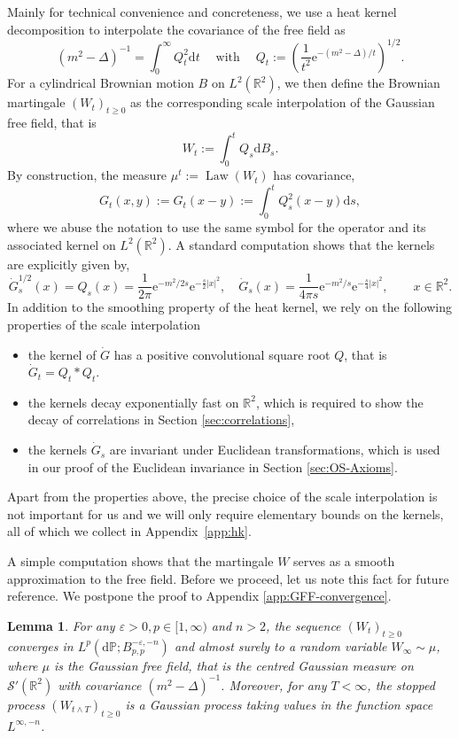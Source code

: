\documentclass[11pt, a4paper]{scrartcl}
\numberwithin{equation}{section}
\theoremstyle{plain}
\newtheorem{lemma}[foo]{Lemma}
\theoremstyle{remark}
\newcommand{\assign}{:=}
\newcommand{\mathd}{\mathrm{d}}
\newcommand{\mathe}{\mathrm{e}}
\newcommand{\tmop}[1]{\ensuremath{\operatorname{#1}}}
\begin{document}
Mainly for technical convenience and concreteness, we use a heat kernel
decomposition to interpolate the covariance of the free field as
\[ (m^2 - \Delta)^{- 1} = \int_0^{\infty} Q_t^2 \mathd t \quad \tmop{with}
	\quad Q_t \assign \left( \frac{1}{t^2} \mathe^{- (m^2 - \Delta) / t}
	\right)^{1 / 2} . \]
For a cylindrical Brownian motion $B$ on $L^2 (\mathbb{R}^2)$, we then define
the Brownian martingale $(W_t)_{t \geqslant 0}$ as the corresponding scale
interpolation of the Gaussian free field, that is
\[ W_t \assign \int_0^t Q_s \mathd B_s . \]
By construction, the measure $\mu^t \assign \tmop{Law} (W_t)$ has covariance,
\begin{equation}
	G_t (x, y) \assign G_t (x - y) \assign \int_0^t Q^2_s (x - y) \mathd s,
	\label{eq:def-G}
\end{equation}
where we abuse the notation to use the same symbol for the operator and its
associated kernel on $L^2 (\mathbb{R}^2)$. A standard computation shows that
the kernels are explicitly given by,
\begin{equation}
	\dot{G}_s^{1 / 2} (x) = Q_s (x) = \frac{1}{2 \pi} \mathe^{- m^2 / 2 s}
	\mathe^{- \frac{s}{2} | x |^2}, \quad \dot{G}_s (x) = \frac{1}{4 \pi s} \mathe^{-
		m^2 / s} \mathe^{- \frac{s}{4} | x |^2} \label{eq:G-kernel}, \qquad x \in
	\mathbb{R}^2 .
\end{equation}
In addition to the smoothing property of the heat kernel, we rely on the following properties of the scale interpolation
\begin{itemize}
	\item the kernel of $\dot{G}$ has a positive convolutional
	      square root $Q$, that is $\dot{G}_t = Q_t \ast Q_t$.
	\item the kernels decay exponentially fast on $\mathbb R^2$, which is required to show the decay of correlations in Section
	      \ref{sec:correlations},
	\item the kernels $\dot{G}_s$ are invariant under Euclidean transformations, which is used in our proof of the Euclidean invariance in Section \ref{sec:OS-Axioms}.
\end{itemize}
Apart from the properties above, the precise choice of the scale
interpolation is not important for us and we will only require elementary
bounds on the kernels, all of which we collect in Appendix~\ref{app:hk}.

A simple computation shows that the martingale $W$ serves as a smooth
approximation to the free field. Before we proceed, let us note this fact for
future reference. We postpone the proof to Appendix \ref{app:GFF-convergence}.
\begin{lemma}
	\label{lem:GFF-convergence}For any $\varepsilon > 0, p \in [1, \infty)$ and
	$n > 2$, the sequence $(W_t)_{t \geqslant 0}$ converges in $L^p (\mathd \mathbb{P} ;
		B_{p, p}^{- \varepsilon, - n})$ and almost surely to a random variable
	$W_{\infty} \sim \mu$, where $\mu$ is the Gaussian free field, that is the
	centred Gaussian measure on $\mathcal{S}' (\mathbb{R}^2)$ with covariance
	$(m^2 - \Delta)^{- 1}$. Moreover, for any $T < \infty$, the stopped process
	$(W_{t \wedge T})_{t \geqslant 0}$ is a Gaussian process taking values in
	the function space $L^{\infty, - n}$.
\end{lemma}
\end{document}
